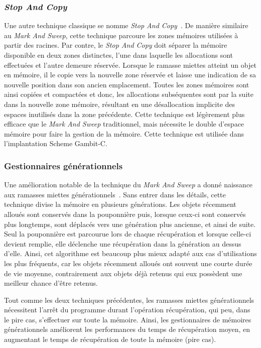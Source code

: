 \documentclass[12pt,oneside,letterpaper,francais]{book}
\begin{document}
\subsubsection{\textit{Stop And Copy}}
Une autre technique classique se nomme \textit{Stop And
  Copy}~\cite{STOP_AND_COPY}. De manière similaire au \textit{Mark And
  Sweep}, cette technique parcoure les zones mémoires utilisées à
partir des racines. Par contre, le \textit{Stop And Copy} doit séparer
la mémoire disponible en deux zones distinctes, l'une dans laquelle
les allocations sont effectuées et l'autre demeure réservée. Lorsque
le ramasse miettes atteint un objet en mémoire, il le copie vers la
nouvelle zone réservée et laisse une indication de sa nouvelle
position dans son ancien emplacement. Toutes les zones mémoires sont
ainsi copiées et compactées et donc, les allocations subséquentes sont
par la suite dans la nouvelle zone mémoire, résultant en une
désallocation implicite des espaces inutilisés dans la zone
précédente. Cette technique est légèrement plus efficace que le
\textit{Mark And Sweep} traditionnel, mais nécessite le double
d'espace mémoire pour faire la gestion de la mémoire. Cette technique
est utilisée dans l'implantation Scheme Gambit-C.

\subsubsection{Gestionnaires générationnels}
Une amélioration notable de la technique du \textit{Mark And Sweep} a
donné naissance aux ramasses miettes
générationnels~\cite{GEN_GC}. Sans entrer dans les détails, cette
technique divise la mémoire en plusieurs générations. Les objets
récemment alloués sont conservés dans la pouponnière puis, lorsque
ceux-ci sont conservés plus longtemps, sont déplacés vers une
génération plus ancienne, et ainsi de suite. Seul la pouponnière est
parcourue lors de chaque récupération et lorsque celle-ci devient
remplie, elle déclenche une récupération dans la génération au dessus
d'elle. Ainsi, cet algorithme est beaucoup plus mieux adapté aux cas
d'utilisations les plus fréquents, car les objets récemment alloués
ont souvent une courte durée de vie moyenne, contrairement aux objets
déjà retenus qui eux possèdent une meilleur chance d'être
retenus. 

Tout comme les deux techniques précédentes, les ramasses miettes
générationnels nécessitent l'arrêt du programme durant l'opération
récupération, qui peu, dans le pire cas, s'effectuer sur toute la
mémoire. Ainsi, les gestionnaires de mémoires générationnels
améliorent les performances du temps de récupération moyen, en
augmentant le temps de récupération de toute la mémoire (pire cas).
\end{document}
